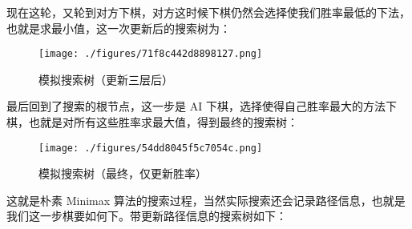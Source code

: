 现在这轮，又轮到对方下棋，对方这时候下棋仍然会选择使我们胜率最低的下法，也就是求最小值，这一次更新后的搜索树为：
\begin{figure}[ht]
\centering
\texttt{[image: ./figures/71f8c442d8898127.png]}
\caption{模拟搜索树（更新三层后）} \label{fig_mmsab_5}
\end{figure}

最后回到了搜索的根节点，这一步是 AI 下棋，选择使得自己胜率最大的方法下棋，也就是对所有这些胜率求最大值，得到最终的搜索树：
\begin{figure}[ht]
\centering
\texttt{[image: ./figures/54dd8045f5c7054c.png]}
\caption{模拟搜索树（最终，仅更新胜率）} \label{fig_mmsab_6}
\end{figure}

这就是朴素 Minimax 算法的搜索过程，当然实际搜索还会记录路径信息，也就是我们这一步棋要如何下。带更新路径信息的搜索树如下：
